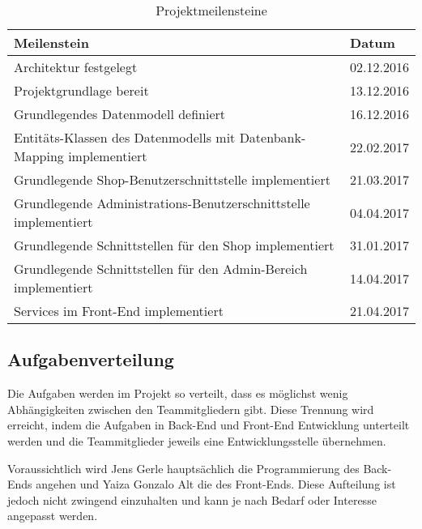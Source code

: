 \begin{table}[ht!]
\begin{tabular}{|p{}|p{}|}
	\hline 
	\textbf{Meilenstein} & \textbf{Datum} \\ 
	\hline 
	Architektur festgelegt & 02.12.2016 \\ 
	\hline 
	Projektgrundlage bereit & 13.12.2016 \\ 
	\hline 
	Grundlegendes Datenmodell definiert & 16.12.2016 \\ 
	\hline 
	Entitäts-Klassen des Datenmodells mit Datenbank-Mapping implementiert & 22.02.2017 \\ 
	\hline 
	Grundlegende Shop-Benutzerschnittstelle implementiert & 21.03.2017 \\ 
	\hline 
	Grundlegende Administrations-Benutzerschnittstelle implementiert & 04.04.2017 \\ 
	\hline 
	Grundlegende Schnittstellen für den Shop implementiert & 31.01.2017 \\ 
	\hline 
	Grundlegende Schnittstellen für den Admin-Bereich implementiert & 14.04.2017 \\ 
	\hline 
	Services im Front-End implementiert	& 21.04.2017 \\ 
	\hline 
\end{tabular} 
\caption{Projektmeilensteine} \label{tab:milestones}
\end{table}


\subsection{Aufgabenverteilung}
Die Aufgaben werden im Projekt so verteilt, dass es möglichst wenig Abhängigkeiten zwischen den Teammitgliedern gibt. Diese Trennung wird erreicht, indem die Aufgaben in Back-End und Front-End Entwicklung unterteilt werden und die Teammitglieder jeweils eine Entwicklungsstelle übernehmen.

Voraussichtlich wird Jens Gerle hauptsächlich die Programmierung des Back-Ends angehen und Yaiza Gonzalo Alt die des Front-Ends. Diese Aufteilung ist jedoch nicht zwingend einzuhalten und kann je nach Bedarf oder Interesse angepasst werden.















